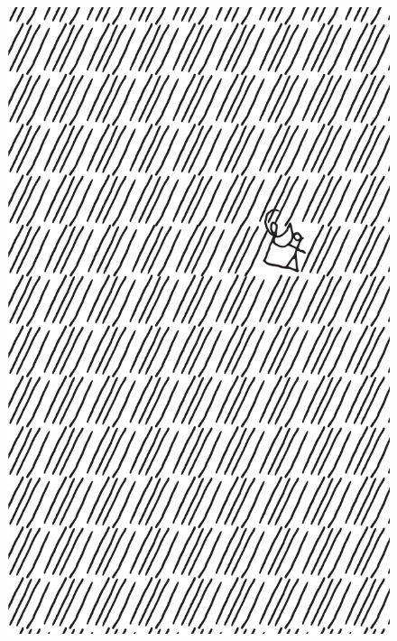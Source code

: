 \makeatletter\@openrightfalse
\movetooddpage
\begin{absolutelynopagebreak}
\begin{vplace}
\begin{figure}[H]
\begin{adjustwidth}{-0.99cm}{}
  \centering
  \vspace*{-1.97cm}
  \hspace*{-0.65cm}
  \includegraphics[width=115mm]{./imgs/img1.pdf}  
  \hfill
\end{adjustwidth}

\thispagestyle{empty}

\end{figure}
\end{vplace}

\end{absolutelynopagebreak}

